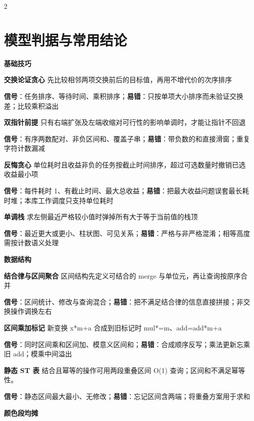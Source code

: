 \documentclass[UTF8,fontset=fandol,a4paper,twoside]{ctexart}
\newcommand{\topic}[1]{\par\smallskip\textbf{#1}\par\nobreak}
\begin{document}
\begin{multicols}{2}
\section{模型判据与常用结论}
\topic{基础技巧}
\par\textbf{交换论证贪心}\quad
先比较相邻两项交换前后的目标值，再用不增代价的次序排序\par
\textbf{信号}：任务排序、等待时间、乘积排序；\textbf{易错}：只按单项大小排序而未验证交换差；比较乘积溢出\par
\par\textbf{双指针前提}\quad
只有右端扩张及左端收缩对可行性的影响单调时，才能让指针不回退\par
\textbf{信号}：有序两数配对、非负区间和、覆盖子串；\textbf{易错}：带负数的和直接滑窗；重复字符计数漏减\par
\par\textbf{反悔贪心}\quad
单位耗时且收益非负的任务按截止时间排序，超过可选数量时撤销已选收益最小项\par
\textbf{信号}：每件耗时 1、有截止时间、最大总收益；\textbf{易错}：把最大收益问题误套最长耗时堆；本库工作调度只支持单位耗时\par
\par\textbf{单调栈}\quad
求左侧最近严格较小值时弹掉所有大于等于当前值的栈顶\par
\textbf{信号}：最近更大或更小、柱状图、可见关系；\textbf{易错}：严格与非严格混淆；相等高度需按计数语义处理\par
\topic{数据结构}
\par\textbf{结合律与区间聚合}\quad
区间结构先定义可结合的 merge 与单位元，再让查询按原序合并\par
\textbf{信号}：区间统计、修改与查询混合；\textbf{易错}：把不满足结合律的信息直接拼接；非交换操作调换左右\par
\par\textbf{区间乘加标记}\quad
新变换 x*m+\allowbreak{}a 合成到旧标记时 mul*=\allowbreak{}m、add=\allowbreak{}add*m+\allowbreak{}a\par
\textbf{信号}：同时区间乘和区间加、模意义区间和；\textbf{易错}：合成顺序反写；乘法更新忘乘旧 add；模乘中间溢出\par
\par\textbf{静态 ST 表}\quad
结合且幂等的操作可用两段重叠区间 O(\allowbreak{}1)\allowbreak{} 查询；区间和不满足幂等性。\par
\textbf{信号}：静态区间最大最小、无修改；\textbf{易错}：忘记区间含两端；将重叠方案用于求和\par
\par\textbf{颜色段均摊}\quad

\end{multicols}
\end{document}
